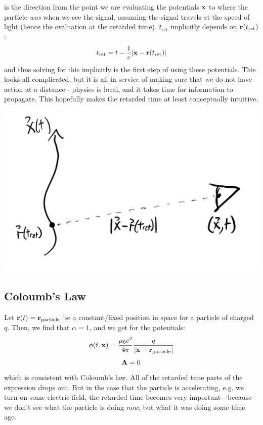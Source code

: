 is the direction from the point we are evaluating the potentials $\mathbf{x}$ to where the particle \emph{was} when we see the signal, assuming the signal travels at the speed of light (hence the evaluation at the retarded time). $t_{\text{ret}}$ implicitly depends on $\mathbf{r}(t_{\text{ret}})$:
\begin{equation}
    t_{\text{ret}} = t - \frac{1}{c}\lvert \mathbf{x} - \mathbf{r}(t_{\text{ret}}) \rvert
\end{equation}
and thus solving for this implicitly is the first step of using these potentials. This looks all complicated, but it is all in service of making sure that we do not have action at a distance - physics is local, and it takes time for information to propagate. This hopefully makes the retarded time at least conceptually intuitive.

\begin{center}
    \includegraphics[scale=0.4]{Lectures/Images/lec8-retardedtime.png}
\end{center}

\subsection{Coloumb's Law}
Let $\mathbf{r}(t) = \mathbf{r}_{\text{particle}}$ be a constant/fixed position in space for a particle of charged $q$. Then, we find that $\alpha = 1$, and we get for the potentials:
\begin{equation}
    \phi(t, \mathbf{x}) = \frac{\mu_0 c^2}{4\pi}\frac{q}{\lvert \mathbf{x} - \mathbf{r}_{\text{particle}} \rvert}
\end{equation}
\begin{equation}
    \mathbf{A} = 0
\end{equation}
which is consistent with Coloumb's law. All of the retarded time parts of the expression drops out. But in the case that the particle is accelerating, e.g. we turn on some electric field, the retarded time becomes very important - because we don't see what the particle is doing \emph{now}, but what it was doing some time ago.

